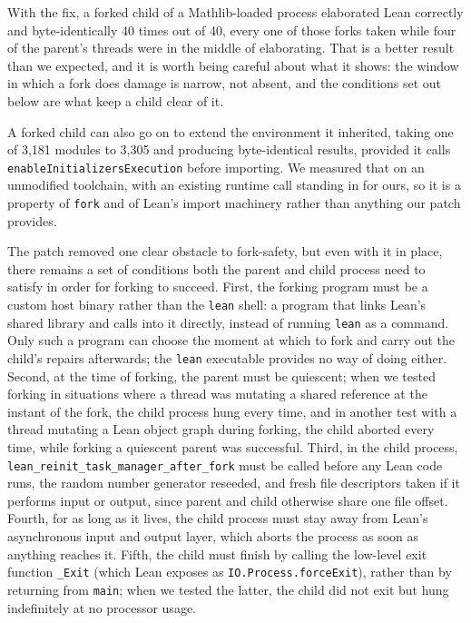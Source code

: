 \documentclass{article}
\newcommand{\Lean}{Lean\xspace}      %
\newcommand{\mathlib}{Mathlib\xspace}
\begin{document}
With the fix, a forked child of a \mathlib-loaded process elaborated \Lean correctly and byte-identically 40 times out of 40, every one of those forks taken while four of the parent's threads were in the middle of elaborating. That is a better result than we expected, and it is worth being careful about what it shows: the window in which a fork does damage is narrow, not absent, and the conditions set out below are what keep a child clear of it.

A forked child can also go on to extend the environment it inherited, taking one of 3{,}181 modules to 3{,}305 and producing byte-identical results, provided it calls \texttt{enableInitializersExecution} before importing. We measured that on an unmodified toolchain, with an existing runtime call standing in for ours, so it is a property of \texttt{fork} and of \Lean's import machinery rather than anything our patch provides.

The patch removed one clear obstacle to fork-safety, but even with it in place, there remains a set of conditions both the parent and child process need to satisfy in order for forking to succeed. 
First, the forking program must be a custom host binary rather than the \texttt{lean} shell: a program that links \Lean's shared library and calls into it directly, instead of running \texttt{lean} as a command. Only such a program can choose the moment at which to fork and carry out the child's repairs afterwards; the \texttt{lean} executable provides no way of doing either.
Second, at the time of forking, the parent must be quiescent; when we tested forking in situations where a thread was mutating a shared reference at the instant of the fork, the child process hung every time, and in another test with a thread mutating a \Lean object graph during forking, the child aborted every time, while forking a quiescent parent was successful.
Third, in the child process, \texttt{lean\_reinit\_task\_manager\_after\_fork} must be called before any \Lean code runs,
the random number generator reseeded,
and fresh file descriptors taken if it performs input or output, since parent and child otherwise share one file offset.
Fourth, for as long as it lives, the child process must stay away from \Lean's asynchronous input and output layer, which aborts the process as soon as anything reaches it.
Fifth, the child must finish by calling the low-level exit function \texttt{\_Exit} (which \Lean exposes as \texttt{IO.Process.forceExit}), rather than by returning from \texttt{main}; when we tested the latter, the child did not exit but hung indefinitely at no processor usage.
\end{document}
